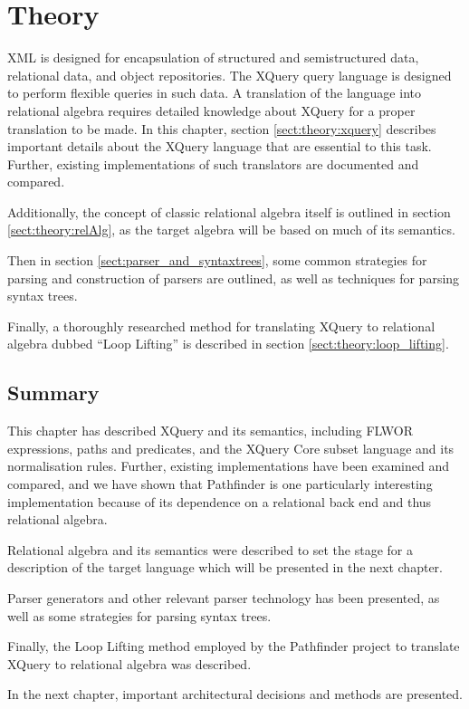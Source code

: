 \chapter{Theory}
\label{chapter:theory}
XML is designed for encapsulation of structured and semistructured data,
relational data, and object repositories. The XQuery query language is designed
to perform flexible queries in such data. A translation of the language into
relational algebra requires detailed knowledge about XQuery for a proper translation to be made. In this chapter, section
\ref{sect:theory:xquery} describes important details about the XQuery
language that are essential to this task. Further, existing implementations of
such translators are documented and compared.

Additionally, the concept of classic relational algebra itself is outlined in
section \ref{sect:theory:relAlg}, as the target algebra will be based on much
of its semantics.

Then in section \ref{sect:parser_and_syntaxtrees}, some common strategies for
parsing and construction of parsers are outlined, as well as techniques for
parsing syntax trees.

Finally, a thoroughly researched method for translating XQuery to relational
algebra dubbed ``Loop Lifting'' is described in section \ref{sect:theory:loop_lifting}.







\section{Summary}
\label{sect:theory:summary}
This chapter has described XQuery and its semantics, including FLWOR
expressions, paths and predicates, and the XQuery Core subset language and its
normalisation rules. Further, existing implementations have been examined and
compared, and we have shown that Pathfinder is one particularly interesting
implementation because of its dependence on a relational back end and thus
relational algebra.

Relational algebra and its semantics were described to set the stage for a
description of the target language which will be presented in the next chapter.

Parser generators and other relevant parser technology has been presented, as
well as some strategies for parsing syntax trees.

Finally, the Loop Lifting method employed by the Pathfinder project to
translate XQuery to relational algebra was described.

In the next chapter, important architectural decisions and methods are
presented.